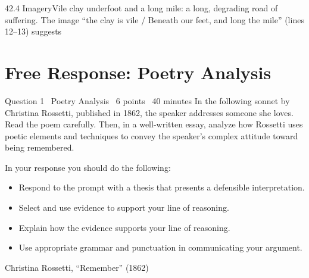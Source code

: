 \documentclass[11pt]{article}
\begin{document}
\begin{q}{4}{2.4 Imagery}{Vile clay underfoot and a long mile: a long, degrading road of suffering.}
The image ``the clay is vile / Beneath our feet, and long the mile'' (lines 12--13) suggests
\end{q}

\section{Free Response: Poetry Analysis}

\begin{frq}{Question 1 \textperiodcentered\ Poetry Analysis \textperiodcentered\ 6 points \textperiodcentered\ 40 minutes}
In the following sonnet by Christina Rossetti, published in 1862, the speaker addresses someone she loves. Read the poem carefully. Then, in a well-written essay, analyze how Rossetti uses poetic elements and techniques to convey the speaker's complex attitude toward being remembered.

In your response you should do the following:
\begin{itemize}[leftmargin=1.4em]
\item Respond to the prompt with a thesis that presents a defensible interpretation.
\item Select and use evidence to support your line of reasoning.
\item Explain how the evidence supports your line of reasoning.
\item Use appropriate grammar and punctuation in communicating your argument.
\end{itemize}
\end{frq}

\begin{poem}{Christina Rossetti, ``Remember'' (1862)}{}
\end{poem}
\end{document}
